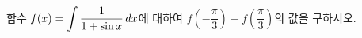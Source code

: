 함수 $f(x)=\displaystyle\int \dfrac{1}{1+\sin x}\mkern3mu dx$에 대하여 $f\left(-\dfrac{\pi}{3}\right)-f\left(\dfrac{\pi}{3}\right)$의 값을 구하시오.
